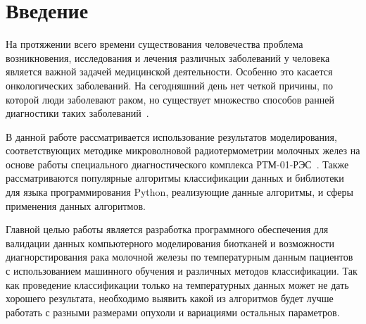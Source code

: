 \newpage
\section{Введение}
На протяжении всего времени существования человечества проблема возникновения, исследования и лечения различных заболеваний у человека является важной задачей медицинской деятельности. Особенно это касается онкологических заболеваний. На сегодняшний день нет четкой причины, по которой люди заболевают раком, но существует множество способов ранней диагностики таких заболеваний~\cite{fear2000}.
\par В данной работе рассматривается использование результатов моделирования, соответствующих методике микроволновой радиотермометрии молочных желез на основе работы специального диагностического комплекса РТМ-01-РЭС~\cite{problemiIzmereniyaVolsu}. Также рассматриваются популярные алгоритмы классификации данных и библиотеки для языка программирования Python, реализующие данные алгоритмы, и сферы применения данных алгоритмов.
\par Главной целью работы является разработка программного обеспечения для валидации данных компьютерного моделирования биотканей и возможности диагнорстирования рака молочной железы по температурным данным пациентов с использованием машинного обучения и различных методов классификации. Так как проведение классификации только на температурных данных может не дать хорошего результата, необходимо выявить какой из алгоритмов будет лучше работать с разными размерами опухоли и вариациями остальных параметров.

